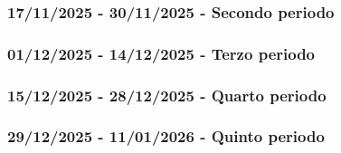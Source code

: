 \documentclass[a4paper,12pt]{article}
\begin{document}
        \subsubsection{17/11/2025 - 30/11/2025 - Secondo periodo}

        \subsubsection{01/12/2025 - 14/12/2025 - Terzo periodo}

        \subsubsection{15/12/2025 - 28/12/2025 - Quarto periodo}

        \subsubsection{29/12/2025 - 11/01/2026 - Quinto periodo}
    
\end{document}
